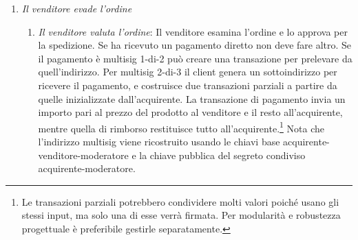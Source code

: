 \begin{enumerate}
\begin{enumerate}
        In realtà, servono solo i valori di apertura impegnati per le due transazioni, e separatamente una copia delle partial key images (con prova di legittimità) e una copia del sottoindirizzo di sessione dell'acquirente. Quel sottoindirizzo ha un doppio scopo: è l'indirizzo dell'acquirente per rimborsi o resti, e la sua chiave di spesa è la chiave base multisig dell'acquirente.\footnote{È importante inizializzare transazioni separate, poiché i valori di apertura impegnati possono essere usati una sola volta.}
        \item {\em L'acquirente autorizza il pagamento}: Dopo aver esaminato tutti i dettagli dell'ordine, l'acquirente lo autorizza.\footnote{Se l'acquirente annulla l'ordine, la sua transazione di finanziamento e le transazioni multisig parziali vengono eliminate.} Il client completa la firma della transazione di finanziamento e la invia alla rete.\footnote{Se il carrello contiene prodotti di più venditori, il client può creare più ordini separati. I venditori possono essere tutti pagati dalla stessa transazione di finanziamento.} Invia l'ordine di acquisto, insieme all'hash della transazione di finanziamento, le transazioni multisig inizializzate, e la chiave pubblica del segreto condiviso acquirente-moderatore, al venditore.\footnote{Il client dell'acquirente dovrebbe tenere traccia dei dettagli dell'ordine come il prezzo totale, per verificare in seguito il contenuto delle transazioni multisig prima di firmarle.}
    \end{enumerate}{}
    \item {\em Il venditore evade l'ordine}
    \begin{enumerate}
        \item {\em Il venditore valuta l'ordine}: Il venditore esamina l'ordine e lo approva per la spedizione. Se ha ricevuto un pagamento diretto non deve fare altro. Se il pagamento è multisig 1-di-2 può creare una transazione per prelevare da quell'indirizzo. Per multisig 2-di-3 il client genera un sottoindirizzo per ricevere il pagamento, e costruisce due transazioni parziali a partire da quelle inizializzate dall'acquirente. La transazione di pagamento invia un importo pari al prezzo del prodotto al venditore e il resto all'acquirente, mentre quella di rimborso restituisce tutto all'acquirente.\footnote{Le transazioni parziali potrebbero condividere molti valori poiché usano gli stessi input, ma solo una di esse verrà firmata. Per modularità e robustezza progettuale è preferibile gestirle separatamente.} Nota che l'indirizzo multisig viene ricostruito usando le chiavi base acquirente-venditore-moderatore e la chiave pubblica del segreto condiviso acquirente-moderatore.

\end{enumerate}
\end{enumerate}
